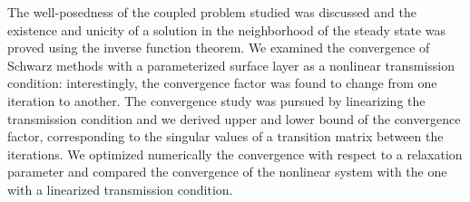 The well-posedness of the coupled problem studied was discussed
and the existence and unicity of a solution in the neighborhood
of the steady state was proved using the inverse function theorem.
We examined the convergence of Schwarz methods with a parameterized
surface layer as a nonlinear transmission condition:
interestingly, the convergence factor was found to change from
one iteration to another.
The convergence study was pursued by linearizing the transmission
condition and we derived upper and lower bound of the
convergence factor,
corresponding to the singular values of a transition matrix between
the iterations.
We optimized numerically the convergence with respect to a relaxation
parameter and compared the convergence of the nonlinear system
with the one with a linearized transmission condition.
\par

